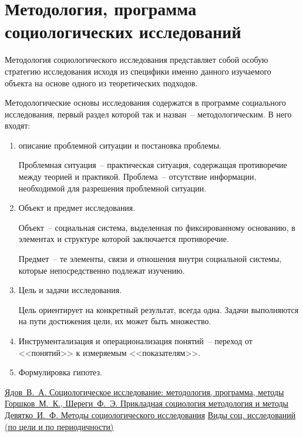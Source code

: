 \section{Методология, программа социологических исследований}

  Методология социологического исследования представляет собой особую стратегию
  исследования исходя из специфики именно данного изучаемого объекта на основе
  одного из теоретических подходов.
  
  Методологические основы исследования содержатся в программе социального
  исследования, первый раздел которой так и назван~-- методологическим. В него
  входят:
  \begin{enumerate}
    \item описание проблемной ситуации и постановка проблемы.
    
      Проблемная ситуация~-- практическая ситуация, содержащая противоречие
      между теорией и практикой. Проблема~-- отсутствие информации, необходимой
      для разрешения проблемной ситуации.
    \item Объект и предмет исследования.
    
      Объект~-- социальная система, выделенная по фиксированному основанию, в
      элементах и структуре которой заключается противоречие.
      
      Предмет~-- те элементы, связи и отношения внутри социальной системы,
      которые непосредственно подлежат изучению.
    \item Цель и задачи исследования.
    
      Цель ориентирует на конкретный результат, всегда одна. Задачи выполняются
      на пути достижения цели, их может быть множество.
    \item Инструментализация и операционализация понятий~-- переход от
      <<понятий>> к измеряемым <<показателям>>.
    \item Формулировка гипотез.
  \end{enumerate}

  \begin{thebibliography}{9}
     \href{http://socioline.ru/sites/default/modules/pubdlcnt/%
      pubdlcnt.php?file=http://socioline.ru/_seminar/library/metod/yadov/%
      met_SI.rar}{Ядов~В.~А. Социологическое исследование: методология,
      программа, методы}
     \href{http://padabum.com/x.php?id=78126}{Горшков~М.~К.,
      Шереги~Ф.~Э. Прикладная социология методология и методы}
     \href{http://www.soc.univ.kiev.ua/LIB/PUB/D/DEVIATKO/%
      deviatko.pdf}{Девятко~И.~Ф. Методы социологического исследования}
     \href{http://vk.cc/2iO5Xy}{Виды соц. исследований (по цели и по
      периодичности)}
  \end{thebibliography}
